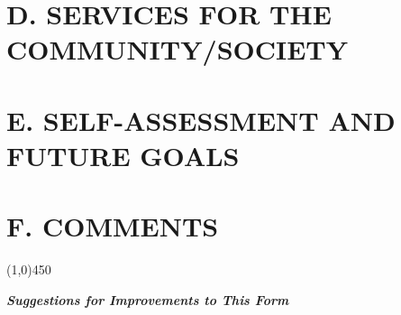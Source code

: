 \documentclass[10pt]{article}
\begin{document}
\section*{D. SERVICES FOR THE COMMUNITY/SOCIETY}



\section*{E. SELF-ASSESSMENT AND FUTURE GOALS}



\section*{F. COMMENTS}





\begin{center}
\line(1,0){450}
\end{center}
{\large\textbf {\textit {Suggestions for Improvements to This Form}}}


\end{document}
